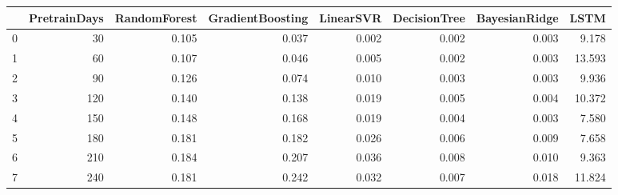 \begin{tabular}{lrrrrrrr}
\toprule
{} &  PretrainDays &  RandomForest &  GradientBoosting &  LinearSVR &  DecisionTree &  BayesianRidge &   LSTM \\
\midrule
0 &            30 &         0.105 &             0.037 &      0.002 &         0.002 &          0.003 &  9.178 \\
1 &            60 &         0.107 &             0.046 &      0.005 &         0.002 &          0.003 & 13.593 \\
2 &            90 &         0.126 &             0.074 &      0.010 &         0.003 &          0.003 &  9.936 \\
3 &           120 &         0.140 &             0.138 &      0.019 &         0.005 &          0.004 & 10.372 \\
4 &           150 &         0.148 &             0.168 &      0.019 &         0.004 &          0.003 &  7.580 \\
5 &           180 &         0.181 &             0.182 &      0.026 &         0.006 &          0.009 &  7.658 \\
6 &           210 &         0.184 &             0.207 &      0.036 &         0.008 &          0.010 &  9.363 \\
7 &           240 &         0.181 &             0.242 &      0.032 &         0.007 &          0.018 & 11.824 \\
\bottomrule
\end{tabular}

